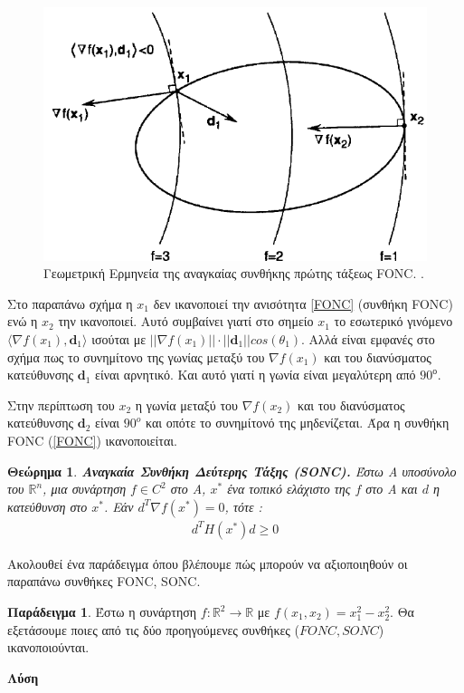 \documentclass[a4paper,12pt,twoside]{report}
\theoremstyle{plain}
\newtheorem{thm}{Θεώρημα}[section] %
\theoremstyle{definition}
\newtheorem{exmp}{Παράδειγμα}[section] %
\theoremstyle{remark}
\begin{document}
\begin{figure}[H]	
	\includegraphics[scale= 0.5]{fonc}
	\centering
    \caption{Γεωμετρική Ερμηνεία της αναγκαίας συνθήκης πρώτης τάξεως FONC.  \cite{chong2013introduction}.}
\end{figure}

Στο παραπάνω σχήμα η $x_1$ δεν ικανοποιεί την ανισότητα \ref{FONC} (συνθήκη FONC) ενώ η $x_2$ την ικανοποιεί. Αυτό συμβαίνει γιατί στο σημείο $x_1$ το εσωτερικό γινόμενο $\langle \nabla f(x_1),\textbf{d}_1\rangle$ ισούται με $||\nabla f(x_1)|| \cdot ||\textbf{d}_1|| cos(\theta_1)$. Αλλά είναι εμφανές στο σχήμα πως το συνημίτονο της γωνίας μεταξύ του $\nabla f(x_1)$ και του διανύσματος κατεύθυνσης $\textbf{d}_1$ είναι αρνητικό. Και αυτό γιατί η γωνία είναι μεγαλύτερη από $90^о$.

Στην περίπτωση του $x_2$ η γωνία μεταξύ του $\nabla f(x_2)$ και του διανύσματος κατεύθυνσης $\textbf{d}_2$ είναι $90^ο$ και οπότε το συνημίτονό της μηδενίζεται. Άρα η συνθήκη FONC (\ref{FONC}) ικανοποιείται.

\begin{thm}{\textbf{Αναγκαία Συνθήκη Δεύτερης Τάξης (SONC).}}
	Έστω A υποσύνολο του $\mathbb{R}^n$, μια συνάρτηση $f\in C^2$ στο Α, $x^*$ ένα τοπικό ελάχιστο της $f$ στο Α και $d$ η κατεύθυνση στο $x^*$. Εάν $d^T\nabla f(x^*)=0$, τότε :
	\begin{align}
		d^TH(x^*)d \geq 0
	\end{align}
\end{thm}

Ακολουθεί ένα παράδειγμα όπου βλέπουμε πώς μπορούν να αξιοποιηθούν οι παραπάνω συνθήκες  FONC, SONC.

\begin{exmp}
	Έστω η συνάρτηση $f:\mathbb{R}^2\rightarrow \mathbb{R}$ με $f(x_1,x_2) = x_1^2-x_2^2$. Θα εξετάσουμε ποιες από τις δύο προηγούμενες συνθήκες ($FONC, SONC$) ικανοποιούνται.
\end{exmp}
\textbf{Λύση}
\end{document}
